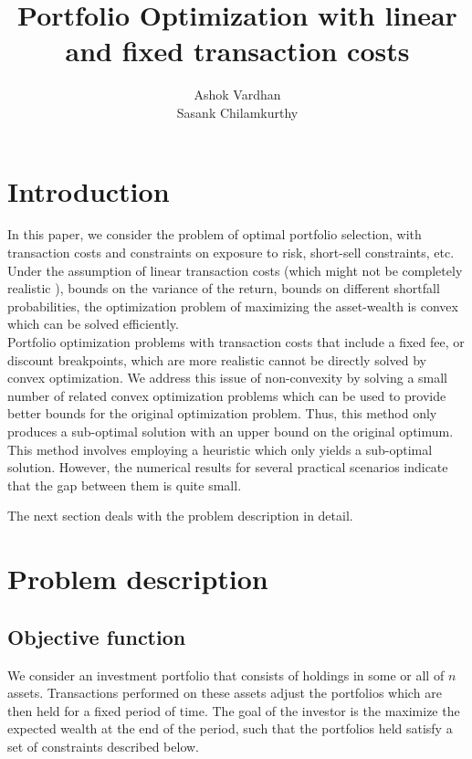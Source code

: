 \documentclass[a4paper]{article}
\title{Portfolio Optimization with linear and fixed transaction costs}
\author{Ashok Vardhan \\ Sasank Chilamkurthy}
\begin{document}
\maketitle


\section{Introduction}

In this paper, we consider the problem of optimal portfolio selection, with transaction costs and constraints on exposure to risk, short-sell constraints, etc. Under the assumption of linear transaction costs (which might not be completely realistic ), bounds on the variance of the return, bounds on  different shortfall probabilities, the optimization problem of maximizing the asset-wealth is convex which can be solved efficiently.\\[0.2em]

Portfolio optimization problems with transaction costs that include a fixed fee, or discount
breakpoints, which are more realistic cannot be directly solved by convex optimization. We address this issue of non-convexity by solving a small number of related convex optimization problems which can be used to provide better bounds for the original optimization problem. Thus, this method only produces a sub-optimal solution with an upper bound on the original optimum. This method involves employing a heuristic which only yields a sub-optimal solution. However, the numerical results for several practical scenarios indicate that the gap between them is quite small.

The next section deals with the problem description in detail.

\section{Problem description}

\subsection{Objective function}

We consider an investment portfolio that consists of holdings in some or all of $n$ assets. Transactions performed on these assets adjust the portfolios which are then held for a fixed period of time. The goal of the investor is the maximize the expected wealth at the end of the period, such that the portfolios held satisfy  a set of constraints described below.\\[0.2em]
\end{document}

